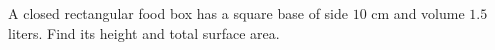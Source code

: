A closed rectangular food box has a square base of side $10$ cm and volume $1.5$ liters. Find its height and total surface area.
